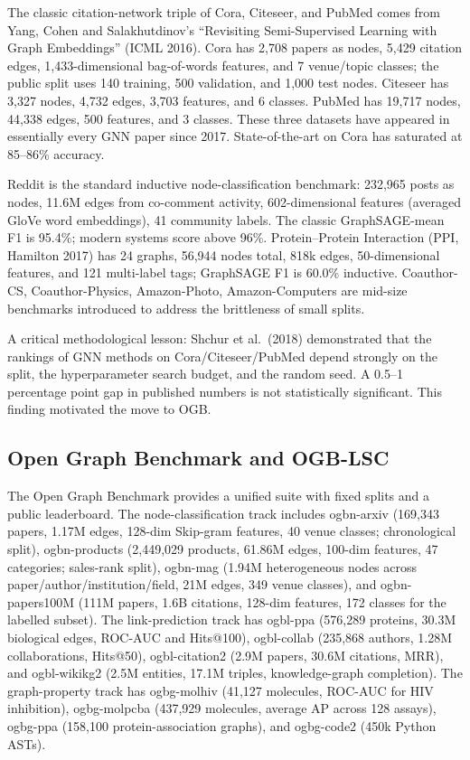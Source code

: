 \documentclass{article}
\begin{document}
The classic citation-network triple of Cora, Citeseer, and PubMed comes from Yang, Cohen and Salakhutdinov's ``Revisiting Semi-Supervised Learning with Graph Embeddings'' (ICML 2016). Cora has 2,708 papers as nodes, 5,429 citation edges, 1,433-dimensional bag-of-words features, and 7 venue/topic classes; the public split uses 140 training, 500 validation, and 1,000 test nodes. Citeseer has 3,327 nodes, 4,732 edges, 3,703 features, and 6 classes. PubMed has 19,717 nodes, 44,338 edges, 500 features, and 3 classes. These three datasets have appeared in essentially every GNN paper since 2017. State-of-the-art on Cora has saturated at 85--86\% accuracy.

Reddit \citep{hamilton2017inductiverepresent} is the standard inductive node-classification benchmark: 232,965 posts as nodes, 11.6M edges from co-comment activity, 602-dimensional features (averaged GloVe word embeddings), 41 community labels. The classic GraphSAGE-mean F1 is 95.4\%; modern systems score above 96\%. Protein--Protein Interaction (PPI, Hamilton 2017) has 24 graphs, 56,944 nodes total, 818k edges, 50-dimensional features, and 121 multi-label tags; GraphSAGE F1 is 60.0\% inductive. Coauthor-CS, Coauthor-Physics, Amazon-Photo, Amazon-Computers \citep{shchur2018pitfallsofgraphneu} are mid-size benchmarks introduced to address the brittleness of small splits.

A critical methodological lesson: Shchur et al.~(2018) demonstrated that the rankings of GNN methods on Cora/Citeseer/PubMed depend strongly on the split, the hyperparameter search budget, and the random seed. A 0.5--1 percentage point gap in published numbers is not statistically significant. This finding motivated the move to OGB.

\subsection{Open Graph Benchmark and OGB-LSC}\label{open-graph-benchmark-and-ogb-lsc}

The Open Graph Benchmark \citep{hu2020opengraphbenchmark} provides a unified suite with fixed splits and a public leaderboard. The node-classification track includes ogbn-arxiv (169,343 papers, 1.17M edges, 128-dim Skip-gram features, 40 venue classes; chronological split), ogbn-products (2,449,029 products, 61.86M edges, 100-dim features, 47 categories; sales-rank split), ogbn-mag (1.94M heterogeneous nodes across paper/author/institution/field, 21M edges, 349 venue classes), and ogbn-papers100M (111M papers, 1.6B citations, 128-dim features, 172 classes for the labelled subset). The link-prediction track has ogbl-ppa (576,289 proteins, 30.3M biological edges, ROC-AUC and Hits@100), ogbl-collab (235,868 authors, 1.28M collaborations, Hits@50), ogbl-citation2 (2.9M papers, 30.6M citations, MRR), and ogbl-wikikg2 (2.5M entities, 17.1M triples, knowledge-graph completion). The graph-property track has ogbg-molhiv (41,127 molecules, ROC-AUC for HIV inhibition), ogbg-molpcba (437,929 molecules, average AP across 128 assays), ogbg-ppa (158,100 protein-association graphs), and ogbg-code2 (450k Python ASTs).
\end{document}
